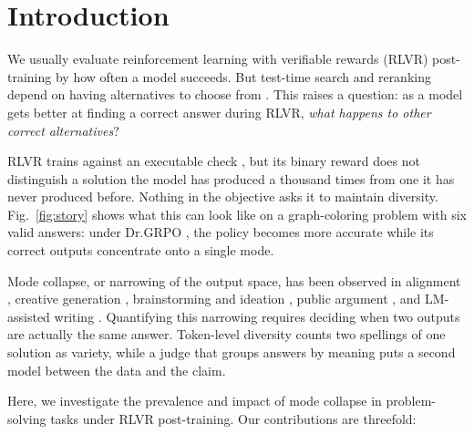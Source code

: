 \documentclass{article}
\newcommand{\1}{\mathbf 1}
\theoremstyle{remark}
\theoremstyle{definition}
\theoremstyle{plain}
\begin{document}
\section{Introduction}
\label{sec:introduction}


We usually evaluate reinforcement learning with verifiable rewards (RLVR) post-training by how often a model succeeds.
But test-time search and reranking depend on having alternatives to choose from \citep{brown2024monkeys,snell2024testtime,cobbe2021training,wang2023selfconsistency}.
This raises a question: as a model gets better at finding a correct answer during RLVR, \textit{what happens to other correct alternatives}?


RLVR trains against an executable check \citep{guo2025deepseekr1}, but its binary reward does not distinguish a solution the model has produced a thousand times from one it has never produced before.
Nothing in the objective asks it to maintain diversity.
Fig.~\ref{fig:story} shows what this can look like on a graph-coloring problem with six valid answers: under Dr.GRPO \citep{liu2025understanding}, the policy becomes more accurate while its correct outputs concentrate onto a single mode.

Mode collapse, or narrowing of the output space, has been observed in alignment \citep{kirk2024understanding,cui2025entropy}, creative generation \citep{doshi2024generative}, brainstorming and ideation \citep{anderson2024homogenization}, public argument \citep{kim2026argument}, and LM-assisted writing \citep{abdulhai2026distort}.
Quantifying this narrowing requires deciding when two outputs are actually the same answer. Token-level diversity \citep{li2016diversity,zhu2018texygen} counts two spellings of one solution as variety, while a judge that groups answers by meaning \citep{farquhar2024detecting,zheng2023judging} puts a second model between the data and the claim.

Here, we investigate the prevalence and impact of mode collapse in problem-solving tasks under RLVR post-training. Our contributions are threefold:
\end{document}
